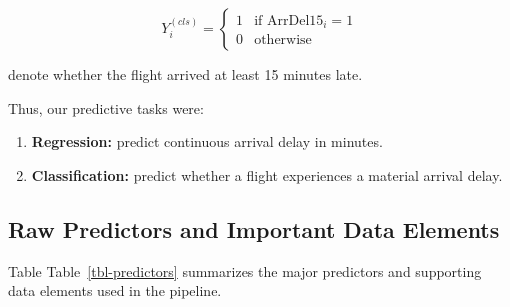 \documentclass[
  letterpaper,
  DIV=11,
  numbers=noendperiod]{scrartcl}
\providecommand{\tightlist}{%
  \setlength{\itemsep}{0pt}\setlength{\parskip}{0pt}}
\begin{document}
\[
Y_i^{(cls)} =
\begin{cases}
1 & \text{if } \text{ArrDel15}_i = 1 \\
0 & \text{otherwise}
\end{cases}
\]

denote whether the flight arrived at least 15 minutes late.

Thus, our predictive tasks were:

\begin{enumerate}
\def\labelenumi{\arabic{enumi}.}
\tightlist
\item
  \textbf{Regression:} predict continuous arrival delay in minutes.
\item
  \textbf{Classification:} predict whether a flight experiences a
  material arrival delay.
\end{enumerate}

\subsection{Raw Predictors and Important Data
Elements}\label{raw-predictors-and-important-data-elements}

Table Table~\ref{tbl-predictors} summarizes the major predictors and
supporting data elements used in the pipeline.
\end{document}
